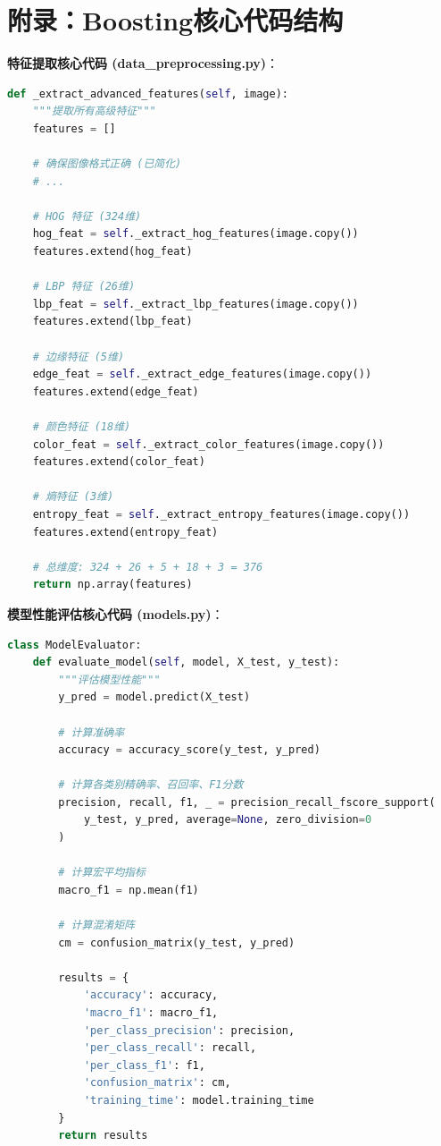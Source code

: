 \documentclass[UTF8]{report}
\theoremstyle{MyLineTheoremStyle} %
\theoremstyle{MyBlockTheoremStyle} %
\theoremstyle{MySubsubsectionStyle} %
\begin{document}
\section{附录：Boosting核心代码结构}
\textbf{特征提取核心代码 (data\_preprocessing.py)}：
\begin{lstlisting}[language=Python, caption={简化的多维特征提取与拼接过程}]
def _extract_advanced_features(self, image):
    """提取所有高级特征"""
    features = []
    
    # 确保图像格式正确 (已简化)
    # ...
    
    # HOG 特征 (324维)
    hog_feat = self._extract_hog_features(image.copy())
    features.extend(hog_feat)
    
    # LBP 特征 (26维)
    lbp_feat = self._extract_lbp_features(image.copy())
    features.extend(lbp_feat)
    
    # 边缘特征 (5维)
    edge_feat = self._extract_edge_features(image.copy())
    features.extend(edge_feat)
    
    # 颜色特征 (18维)
    color_feat = self._extract_color_features(image.copy())
    features.extend(color_feat)
    
    # 熵特征 (3维)
    entropy_feat = self._extract_entropy_features(image.copy())
    features.extend(entropy_feat)
    
    # 总维度: 324 + 26 + 5 + 18 + 3 = 376
    return np.array(features)
\end{lstlisting}

\textbf{模型性能评估核心代码 (models.py)}：
\begin{lstlisting}[language=Python, caption={模型评估与关键指标计算}]
class ModelEvaluator:
    def evaluate_model(self, model, X_test, y_test):
        """评估模型性能"""
        y_pred = model.predict(X_test)
        
        # 计算准确率
        accuracy = accuracy_score(y_test, y_pred)
        
        # 计算各类别精确率、召回率、F1分数
        precision, recall, f1, _ = precision_recall_fscore_support(
            y_test, y_pred, average=None, zero_division=0
        )
        
        # 计算宏平均指标
        macro_f1 = np.mean(f1)
        
        # 计算混淆矩阵
        cm = confusion_matrix(y_test, y_pred)
        
        results = {
            'accuracy': accuracy,
            'macro_f1': macro_f1,
            'per_class_precision': precision,
            'per_class_recall': recall,
            'per_class_f1': f1,
            'confusion_matrix': cm,
            'training_time': model.training_time
        }
        return results
\end{lstlisting}
\end{document}
